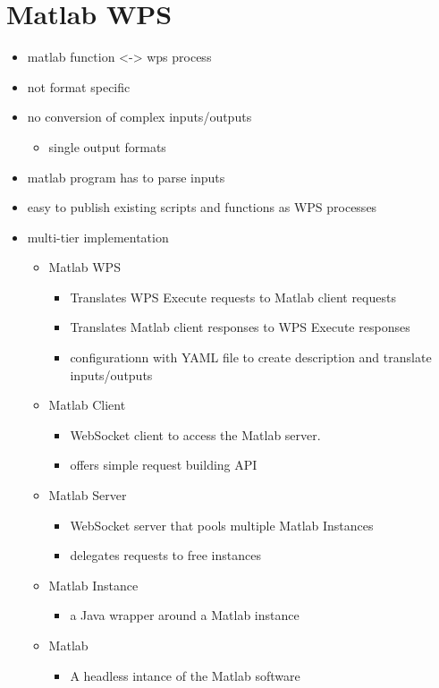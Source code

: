 \section{Matlab WPS}
\begin{itemize}
	\item matlab function <-> wps process
	\item not format specific
	\item no conversion of complex inputs/outputs
	\begin{itemize}
		\item single output formats
	\end{itemize}
	\item matlab program has to parse inputs
	\item easy to publish existing scripts and functions as WPS processes
	\item multi-tier implementation
	\begin{itemize}
		\item Matlab WPS
		\begin{itemize}
			\item Translates WPS Execute requests to Matlab client requests
			\item Translates Matlab client responses to WPS Execute responses
			\item configurationn with YAML file to create description and translate inputs/outputs
		\end{itemize}
		\item Matlab Client
		\begin{itemize}
			\item WebSocket client to access the Matlab server.
			\item offers simple request building API
		\end{itemize}
		\item Matlab Server
		\begin{itemize}
			\item WebSocket server that pools multiple Matlab Instances
			\item delegates requests to free instances
		\end{itemize}
		\item Matlab Instance
		\begin{itemize}
			\item a Java wrapper around a Matlab instance
		\end{itemize}
		\item Matlab
		\begin{itemize}
			\item A headless intance of the Matlab software
		\end{itemize}
	\end{itemize}
\end{itemize}
